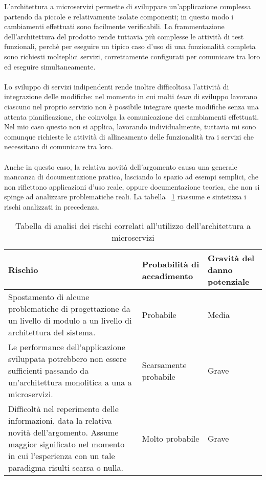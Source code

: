 L'architettura a microservizi permette di sviluppare un'applicazione complessa partendo da piccole e relativamente isolate componenti;
in questo modo i cambiamenti effettuati sono facilmente verificabili.
La frammentazione dell'architettura del prodotto rende tuttavia più complesse le attività di test funzionali, perchè per eseguire un tipico caso d'uso di una funzionalità completa sono richiesti molteplici servizi, correttamente configurati per comunicare tra loro ed eseguire simultaneamente. \\ \\
Lo sviluppo di servizi indipendenti rende inoltre difficoltosa l'attività di integrazione delle modifiche: nel momento in cui molti \emph{team} di sviluppo lavorano ciascuno nel proprio servizio non è possibile integrare queste modifiche senza una attenta pianificazione, che coinvolga la comunicazione dei cambiamenti effettuati. \\
Nel mio caso questo non si applica, lavorando individualmente, tuttavia mi sono comunque richieste le attività di allineamento delle funzionalità tra i servizi che necessitano di comunicare tra loro. \\ \\
Anche in questo caso, la relativa novità dell'argomento causa una generale mancanza di documentazione pratica, lasciando lo spazio ad esempi semplici, che non riflettono applicazioni d'uso reale, oppure documentazione teorica, che non si spinge ad analizzare problematiche reali.
La tabella ~\ref{tab:rischi-arch-microservizi} riassume e sintetizza i rischi analizzati in precedenza.

\begin{table}[H]
\caption{Tabella di analisi dei rischi correlati all'utilizzo dell'architettura a microservizi}
\label{tab:rischi-arch-microservizi}
\begin{tabularx}{\linewidth}{|p{7.5cm}|X|X|}
\hline
\textbf{Rischio} & \textbf{Probabilità di accadimento} & \textbf{Gravità del danno potenziale}\\
\hline
Spostamento di alcune problematiche di progettazione da un livello di modulo a un livello di architettura del sistema. & Probabile & Media \\
\hline
Le performance dell'applicazione sviluppata potrebbero non essere sufficienti passando da un'architettura monolitica a una a microservizi. & Scarsamente probabile & Grave \\
\hline
Difficoltà nel reperimento delle informazioni, data la relativa novità dell'argomento. Assume maggior significato nel momento in cui l'esperienza con un tale paradigma risulti scarsa o nulla. & Molto probabile & Grave \\
\hline
\end{tabularx}
\end{table}
